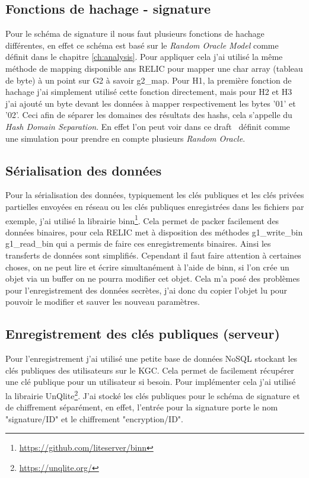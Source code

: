 \subsection{Fonctions de hachage - signature}
Pour le schéma de signature il nous faut plusieurs fonctions de hachage différentes, en effet ce schéma est basé sur le \textit{Random Oracle Model} comme définit dans le chapitre \ref{ch:analysis}. Pour appliquer cela j'ai utilisé la même méthode de mapping disponible ans RELIC pour mapper une char array (tableau de byte) à un point sur G2 à savoir g2\_map.
Pour H1, la première fonction de hachage j'ai simplement utilisé cette fonction directement, mais pour H2 et H3 j'ai ajouté un byte devant les données à mapper respectivement les bytes '01' et '02'. Ceci afin de séparer les domaines des résultats des hashs, cela s'appelle du \textit{Hash Domain Separation}. En effet l'on peut voir dans ce draft~\cite{irtf-cfrg-hash-to-curve} définit comme une simulation pour prendre en compte plusieurs \textit{Random Oracle}.
\subsection{Sérialisation des données}
Pour la sérialisation des données, typiquement les clés publiques et les clés privées partielles envoyées en réseau ou les clés publiques enregistrées dans les fichiers par exemple, j'ai utilisé la librairie binn\footnote{\url{https://github.com/liteserver/binn}}. Cela permet de packer facilement des données binaires, pour cela RELIC met à disposition des méthodes g1\_write\_bin g1\_read\_bin qui a permis de faire ces enregistrements binaires. Ainsi les transferts de données sont simplifiés. Cependant il faut faire attention à certaines choses, on ne peut lire et écrire simultanément à l'aide de binn, si l'on crée un objet via un buffer on ne pourra modifier cet objet. Cela m'a posé des problèmes pour l'enregistrement des données secrètes, j'ai donc du copier l'objet lu pour pouvoir le modifier et sauver les nouveau paramètres.
\subsection{Enregistrement des clés publiques (serveur)}
Pour l'enregistrement j'ai utilisé une petite base de données NoSQL stockant les clés publiques des utilisateurs sur le KGC. Cela permet de facilement récupérer une clé publique pour un utilisateur si besoin. Pour implémenter cela j'ai utilisé la librairie UnQlite\footnote{\url{https://unqlite.org/}}. J'ai stocké les clés publiques pour le schéma de signature et de chiffrement séparément, en effet, l'entrée pour la signature porte le nom "signature/ID" et le chiffrement "encryption/ID".

